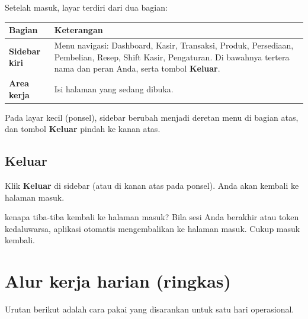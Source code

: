\documentclass[11pt,a4paper]{article}
\newcommand{\btn}[1]{\textcolor{primary}{\textbf{#1}}}
\begin{document}
Setelah masuk, layar terdiri dari dua bagian:

\begin{tabularx}{\textwidth}{@{}L{4.2cm}Y@{}}
  \toprule
  \textbf{Bagian} & \textbf{Keterangan} \\
  \midrule
  \textbf{Sidebar kiri} & Menu navigasi: Dashboard, Kasir, Transaksi, Produk, Persediaan, Pembelian, Resep, Shift Kasir, Pengaturan. Di bawahnya tertera nama dan peran Anda, serta tombol \btn{Keluar}. \\
  \textbf{Area kerja}   & Isi halaman yang sedang dibuka. \\
  \bottomrule
\end{tabularx}

Pada layar kecil (ponsel), sidebar berubah menjadi deretan menu di bagian atas,
dan tombol \btn{Keluar} pindah ke kanan atas.

\subsection{Keluar}
Klik \btn{Keluar} di sidebar (atau di kanan atas pada ponsel). Anda akan kembali
ke halaman masuk.

\begin{tipbox}{kenapa tiba-tiba kembali ke halaman masuk?}
Bila sesi Anda berakhir atau token kedaluwarsa, aplikasi otomatis
mengembalikan ke halaman masuk. Cukup masuk kembali.
\end{tipbox}

\section{Alur kerja harian (ringkas)}

Urutan berikut adalah cara pakai yang disarankan untuk satu hari operasional.
\end{document}
